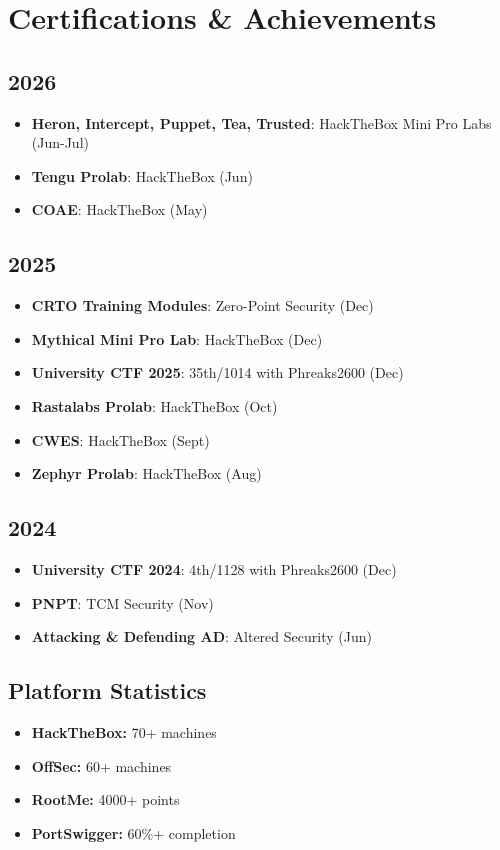 \documentclass[9pt,a4paper]{extarticle}
\begin{document}
\begin{minipage}[t]{0.48\textwidth}

\section{Certifications \& Achievements}

\subsection*{2026}
\begin{itemize}
\item \textbf{Heron, Intercept, Puppet, Tea, Trusted}: HackTheBox Mini Pro Labs (Jun-Jul)
\item \textbf{Tengu Prolab}: HackTheBox (Jun)
\item \textbf{COAE}: HackTheBox (May)
\end{itemize}

\subsection*{2025}
\begin{itemize}
\item \textbf{CRTO Training Modules}: Zero-Point Security (Dec)
\item \textbf{Mythical Mini Pro Lab}: HackTheBox (Dec)
\item \textbf{University CTF 2025}: 35th/1014 with Phreaks2600 (Dec)
\item \textbf{Rastalabs Prolab}: HackTheBox (Oct)
\item \textbf{CWES}: HackTheBox (Sept)
\item \textbf{Zephyr Prolab}: HackTheBox (Aug)
\end{itemize}

\subsection*{2024}
\begin{itemize}
\item \textbf{University CTF 2024}: 4th/1128 with Phreaks2600 (Dec)
\item \textbf{PNPT}: TCM Security (Nov)
\item \textbf{Attacking \& Defending AD}: Altered Security (Jun)
\end{itemize}

\subsection*{Platform Statistics}
\begin{itemize}
\item \textbf{HackTheBox:} 70+ machines
\item \textbf{OffSec:} 60+ machines
\item \textbf{RootMe:} 4000+ points
\item \textbf{PortSwigger:} 60\%+ completion
\end{itemize}


\end{minipage}
\end{document}
